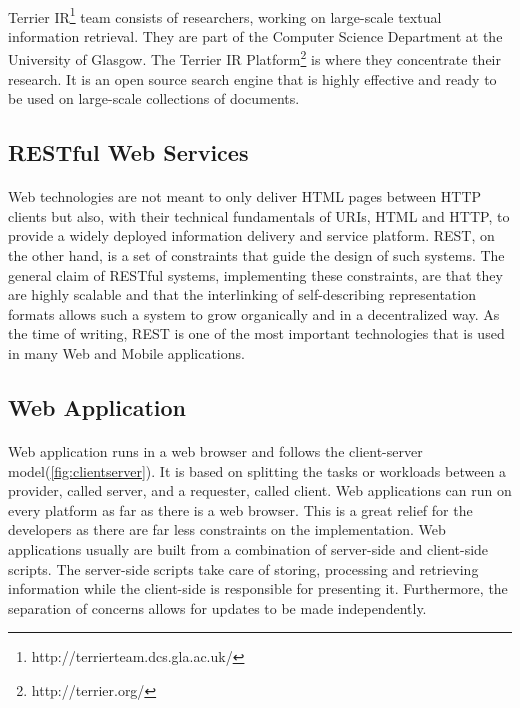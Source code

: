 \documentclass{l4proj}
\begin{document}
\paragraph{}
Terrier IR\footnote{http://terrierteam.dcs.gla.ac.uk/} team consists of researchers, working on large-scale textual information retrieval. They are part of the Computer Science Department at the University of Glasgow. The Terrier IR Platform\footnote{http://terrier.org/} is where they concentrate their research. It is an open source search engine that is highly effective and ready to be used on large-scale collections of documents. 

\subsection{RESTful Web Services}
\paragraph{}
Web technologies are not meant to only deliver HTML pages between HTTP clients but also, with their technical fundamentals of URIs, HTML and HTTP, to provide a widely deployed information delivery and service platform. REST, on the other hand, is a set of constraints that guide the design of such systems. The general claim of RESTful systems, implementing these constraints, are that they are highly scalable and that the interlinking of self-describing representation formats allows such a system to grow organically and in a decentralized way\cite{restful}. As the time of writing, REST is one of the most important technologies that is used in many Web and Mobile applications.

\subsection{Web Application}
\paragraph{}
Web application runs in a web browser and follows the client-server model(\ref{fig:clientserver}). It is based on splitting the tasks or workloads between a provider, called server, and a requester, called client. Web applications can run on every platform as far as there is a web browser. This is a great relief for the developers as there are far less constraints on the implementation. Web applications usually are built from a combination of  server-side and client-side scripts. The server-side scripts take care of storing, processing and retrieving information while the client-side is responsible for presenting it. Furthermore, the separation of concerns allows for updates to be made independently.    
\end{document}
